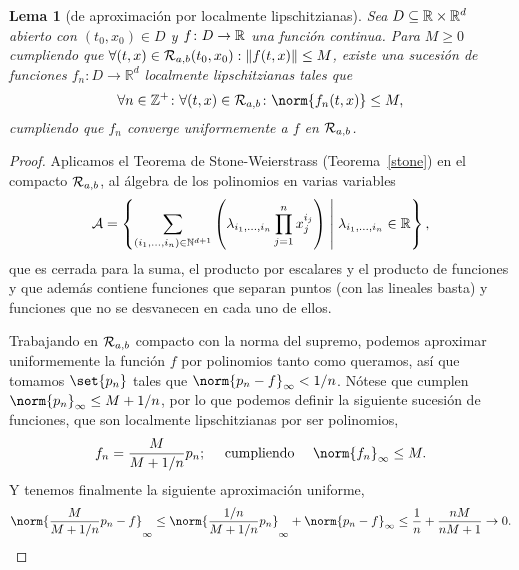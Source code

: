 \documentclass[11pt]{article}
\theoremstyle{plain}
\newtheorem{lemma}{Lema}
\theoremstyle{definition}
\theoremstyle{remark}
\begin{document}
\begin{lemma}[de aproximación por localmente lipschitzianas]\label{aprox-ll}
  Sea $D \subseteq \mathbb{R} \times \mathbb{R}^d$ abierto con $(t_0,x_0) \in D$ y $f \colon D \to \mathbb{R}$ una función continua.
  Para \(M \geq 0\) cumpliendo que \(\forall (t,x)\in {{\cal{R}}}_{a,b}(t_0,x_0) : \|f(t,x)\| \leq M\), existe
  una sucesión de funciones $f_n \colon D \to \mathbb{R}^d$ localmente lipschitzianas
  tales que
  \[
    \forall n \in \ZZ^+\colon
    \forall (t,x) \in {\eR}_{a,b}\colon
    \norm{f_n(t,x)} \leq M,
  \]
  cumpliendo que $f_n$ converge uniformemente a $f$ en ${{\cal{R}}}_{a,b}$.
\end{lemma}
\begin{proof}
  Aplicamos el Teorema de Stone-Weierstrass (Teorema~\ref{stone}) en
  el compacto ${{\cal{R}}}_{a,b}$, al álgebra de los polinomios en varias variables
  \[
    {\cal A} =
    \left\{ \sum_{(i_1,\dots,i_n) \in \mathbb{N}^{d+1}}
      \left(\lambda_{i_1,\dots,i_n} \prod_{j=1}^n x_j^{i_j}\right)
      \;\middle|\;
      \lambda_{i_1,\dots,i_n} \in \mathbb{R}
    \right\},
  \]
  que es cerrada para la suma, el producto por escalares y el producto
  de funciones y que además contiene funciones que separan puntos (con las
  lineales basta) y funciones que no se desvanecen en cada uno de ellos.

  Trabajando en ${{\cal{R}}}_{a,b}$ compacto con la norma del supremo, podemos aproximar
  uniformemente la función $f$ por polinomios tanto como queramos, así que
  tomamos $\set{p_n}$ tales que $\norm{p_n - f}_\infty < 1/n$. Nótese que cumplen $\norm{p_n}_\infty \leq M + 1/n$,
  por lo que podemos definir la siguiente sucesión de funciones, que son
  localmente lipschitzianas por ser polinomios,
  \[
    f_n = \frac{M}{M+1/n}p_n;\quad\mbox{ cumpliendo }\quad
    \norm{f_n}_\infty \leq M.
  \]
  Y tenemos finalmente la siguiente aproximación uniforme,
  \[
    \norm{\frac{M}{M + 1/n} p_n - f}_\infty \leq
    \norm{\frac{1/n}{M + 1/n}p_n}_\infty + \norm{p_n - f}_\infty \leq
    \frac{1}{n} + \frac{nM}{nM+1} \to 0.\qedhere
  \]
\end{proof}
\end{document}
